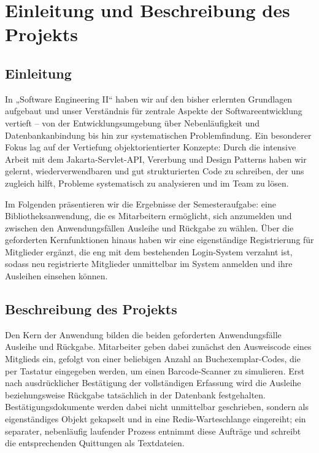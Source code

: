 \section{Einleitung und Beschreibung des Projekts}

\subsection{Einleitung}

In „Software Engineering II“ haben wir auf den bisher erlernten Grundlagen aufgebaut und unser Verständnis für zentrale Aspekte der Softwareentwicklung vertieft – von der Entwicklungsumgebung über Nebenläufigkeit und Datenbankanbindung bis hin zur systematischen Problemfindung. Ein besonderer Fokus lag auf der Vertiefung objektorientierter Konzepte: Durch die intensive Arbeit mit dem Jakarta-Servlet-API, Vererbung und Design Patterns haben wir gelernt, wiederverwendbaren und gut strukturierten Code zu schreiben, der uns zugleich hilft, Probleme systematisch zu analysieren und im Team zu lösen.

Im Folgenden präsentieren wir die Ergebnisse der Semesteraufgabe: eine Bibliotheksanwendung, die es Mitarbeitern ermöglicht, sich anzumelden und zwischen den Anwendungsfällen Ausleihe und Rückgabe zu wählen. Über die geforderten Kernfunktionen hinaus haben wir eine eigenständige Registrierung für Mitglieder ergänzt, die eng mit dem bestehenden Login-System verzahnt ist, sodass neu registrierte Mitglieder unmittelbar im System anmelden und ihre Ausleihen einsehen können.

\subsection{Beschreibung des Projekts}

Den Kern der Anwendung bilden die beiden geforderten Anwendungsfälle Ausleihe und Rückgabe. Mitarbeiter geben dabei zunächst den Ausweiscode eines Mitglieds ein, gefolgt von einer beliebigen Anzahl an Buchexemplar-Codes, die per Tastatur eingegeben werden, um einen Barcode-Scanner zu simulieren. Erst nach ausdrücklicher Bestätigung der vollständigen Erfassung wird die Ausleihe beziehungsweise Rückgabe tatsächlich in der Datenbank festgehalten. Bestätigungsdokumente werden dabei nicht unmittelbar geschrieben, sondern als eigenständiges Objekt gekapselt und in eine Redis-Warteschlange eingereiht; ein separater, nebenläufig laufender Prozess entnimmt diese Aufträge und schreibt die entsprechenden Quittungen als Textdateien.

